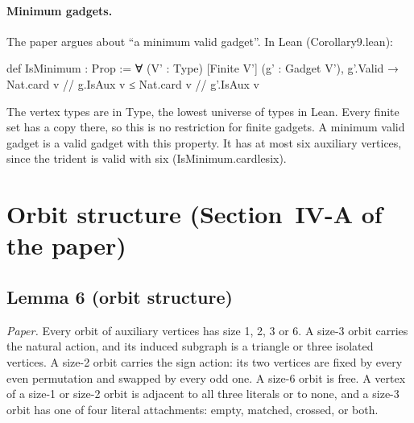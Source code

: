 \documentclass[11pt,a4paper]{article}
\newcommand{\leanus}{\textunderscore\allowbreak}
\newcommand{\lean}[1]{{\ttfamily\let\_\leanus #1}}
\begin{document}
\paragraph{Minimum gadgets.} The paper argues about ``a minimum valid
gadget''. In Lean (\lean{Corollary9.lean}):
\begin{code}
def IsMinimum : Prop :=
  ∀ (V' : Type) [Finite V'] (g' : Gadget V'), g'.Valid →
    Nat.card {v // g.IsAux v} ≤ Nat.card {v // g'.IsAux v}
\end{code}
The vertex types are in \lean{Type}, the lowest universe of types in Lean.
Every finite set has a copy there, so this is no restriction for finite
gadgets. A minimum valid gadget is a valid gadget with this property. It has
at most six auxiliary vertices, since the trident is valid with six
(\lean{IsMinimum.card\_le\_six}).

\section{Orbit structure (Section~IV-A of the paper)}\label{sec:orbits}

\subsection{Lemma 6 (orbit structure)}\label{sec:lemma6}
\emph{Paper.} Every orbit of auxiliary vertices has size 1, 2, 3 or 6. A
size-3 orbit carries the natural action, and its induced subgraph is a
triangle or three isolated vertices. A size-2 orbit carries the sign action:
its two vertices are fixed by every even permutation and swapped by every
odd one. A size-6 orbit is free. A vertex of a size-1 or size-2 orbit is
adjacent to all three literals or to none, and a size-3 orbit has one of
four literal attachments: empty, matched, crossed, or both.
\end{document}
